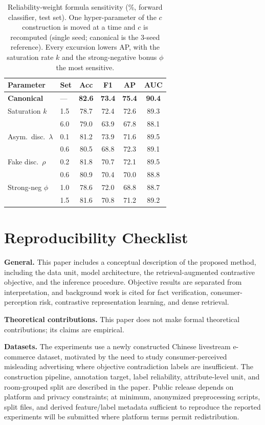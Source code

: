 \documentclass[letterpaper]{article}
\newcommand{\best}[1]{\textbf{#1}}
\begin{document}
\begin{table}[t]
\centering\small
\setlength{\tabcolsep}{5pt}
\begin{tabular}{llcccc}
\toprule
Parameter & Set & Acc & F1 & AP & AUC \\
\midrule
\textbf{Canonical} & --- & \best{82.6} & \best{73.4} & \best{75.4} & \best{90.4} \\
Saturation $k$ & 1.5 & 78.7 & 72.4 & 72.6 & 89.3 \\
 & 6.0 & 79.0 & 63.9 & 67.8 & 88.1 \\
Asym.\ disc.\ $\lambda$ & 0.1 & 81.2 & 73.9 & 71.6 & 89.5 \\
 & 0.6 & 80.5 & 68.8 & 72.3 & 89.1 \\
Fake disc.\ $\rho$ & 0.2 & 81.8 & 70.7 & 72.1 & 89.5 \\
 & 0.6 & 80.9 & 70.4 & 70.0 & 88.8 \\
Strong-neg $\phi$ & 1.0 & 78.6 & 72.0 & 68.8 & 88.7 \\
 & 1.5 & 81.6 & 70.8 & 71.2 & 89.2 \\
\bottomrule
\end{tabular}
\caption{Reliability-weight formula sensitivity (\%, forward classifier, test set). One hyper-parameter of the $c$ construction is moved at a time and $c$ is recomputed (single seed; canonical is the 3-seed reference). Every excursion lowers AP, with the saturation rate $k$ and the strong-negative bonus $\phi$ the most sensitive.}
\label{tab:rwformula}
\end{table}

\section*{Reproducibility Checklist}

\textbf{General.} This paper includes a conceptual description of the proposed method, including the data unit, model architecture, the retrieval-augmented contrastive objective, and the inference procedure. Objective results are separated from interpretation, and background work is cited for fact verification, consumer-perception risk, contrastive representation learning, and dense retrieval.

\textbf{Theoretical contributions.} This paper does not make formal theoretical contributions; its claims are empirical.

\textbf{Datasets.} The experiments use a newly constructed Chinese livestream e-commerce dataset, motivated by the need to study consumer-perceived misleading advertising where objective contradiction labels are insufficient. The construction pipeline, annotation target, label reliability, attribute-level unit, and room-grouped split are described in the paper. Public release depends on platform and privacy constraints; at minimum, anonymized preprocessing scripts, split files, and derived feature/label metadata sufficient to reproduce the reported experiments will be submitted where platform terms permit redistribution.
\end{document}

